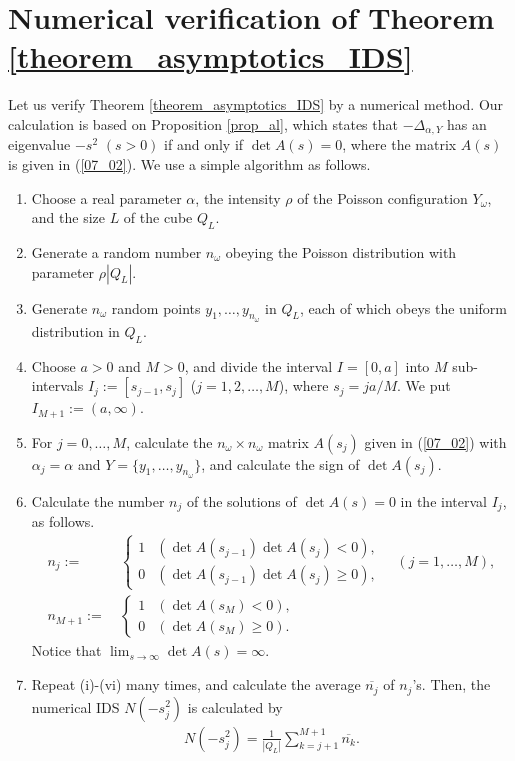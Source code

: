 \documentclass[12pt,a4paper]{article}
\begin{document}
\section{Numerical verification of Theorem \ref{theorem_asymptotics_IDS}}
\label{section_num}
Let us verify Theorem \ref{theorem_asymptotics_IDS}
by a numerical method.
Our calculation is based on Proposition \ref{prop_al},
which states that $-\Delta_{\alpha,Y}$ has an eigenvalue $-s^2$ $(s>0)$
if and only if $\det A(s)=0$, where the matrix $A(s)$ is given in 
(\ref{07_02}).
We use a simple algorithm as follows.
\begin{enumerate}
 \item[(i)] 
Choose a real parameter $\alpha$,
the intensity $\rho$ of the Poisson configuration $Y_\omega$,
and the size $L$ of the cube $Q_L$.


 \item[(ii)] Generate a random number $n_\omega$
obeying the Poisson distribution with parameter 
$\rho|Q_L|$.


 \item[(iii)] Generate $n_\omega$ random points 
$y_1,\ldots,y_{n_\omega}$ in $Q_L$,
each of which obeys the uniform distribution in $Q_L$.


 \item[(iv)] Choose $a>0$ and $M>0$,
and divide the interval $I=[0,a]$ into 
$M$ sub-intervals $I_j:=[s_{j-1},s_j]$ ($j=1,2,\ldots,M$), where $s_j=ja/M$.
We put $I_{M+1}:=(a,\infty)$.

 \item[(v)] For $j=0,\ldots,M$, calculate the $n_\omega\times n_\omega$
matrix $A(s_j)$ given in (\ref{07_02})
with 
$\alpha_j=\alpha$ and 
$Y=\{y_1,\ldots,y_{n_\omega}\}$, 
and calculate the sign of $\det A(s_j)$.


 \item[(vi)] 
Calculate the number $n_j$ of the solutions of 
$\det A(s)=0$ in the interval $I_j$, as follows.
\begin{align*}
 n_j :=&\ 
\begin{cases}
 1 & (\det A(s_{j-1})\det A(s_j)<0),\\
 0 & (\det A(s_{j-1})\det A(s_j)\geq 0),
\end{cases}
\quad(j=1,\ldots,M),\\
n_{M+1} :=&\ 
\begin{cases}
 1 & (\det A(s_M)<0),\\
 0 & (\det A(s_M)\geq 0).
\end{cases}
\end{align*}
Notice that $\displaystyle \lim_{s\to \infty} \det A(s)=\infty$.


 \item[(vii)] Repeat (i)-(vi) many times,
and calculate the average $\overline{n_j}$ of $n_j$'s.
Then, the numerical IDS $N(-s_j^2)$ is calculated by
\begin{align*}
N(-s_j^2) = \frac{1}{|Q_L|}\sum_{k={j+1}}^{M+1} \overline{n_k}.
\end{align*}
\end{enumerate}
\end{document}
